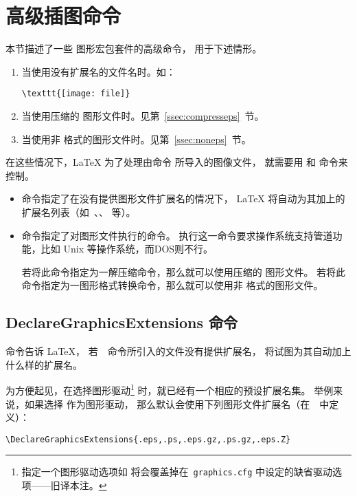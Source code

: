 \section{高级插图命令}\label{sec:adgraphcmd}
本节描述了一些 \LaTeXe{} 图形宏包套件的高级命令，
用于下述情形。
\begin{enumerate}
	\item 当使用没有扩展名的文件名时。如：
\begin{lstlisting}
\texttt{[image: file]}
\end{lstlisting}

	\item 当使用压缩的 图形文件时。见第~\ref{ssec:compresseps}~节。
	\item 当使用非 格式的图形文件时。见第~\ref{ssec:noneps}~节。
\end{enumerate}
在这些情况下，\LaTeX{} 为了处理由命令  所导入的图像文件，
就需要用  和  命令来控制。
\begin{itemize}
	\item {} 命令指定了在没有提供图形文件扩展名的情况下，
	\LaTeX{} 将自动为其加上的扩展名列表（如~、、 等）。
	\item {} 命令指定了对图形文件执行的命令。
	执行这一命令要求操作系统支持管道功能，比如 Unix 等操作系统，而DOS则不行。
	
	若将此命令指定为一解压缩命令，那么就可以使用压缩的  图形文件。
	若将此命令指定为一图形格式转换命令，那么就可以使用非 格式的图形文件。
\end{itemize}

\subsection{DeclareGraphicsExtensions 命令}\label{ssec:deextension}
 命令告诉 \LaTeX{}，
若~~命令所引入的文件没有提供扩展名，
将试图为其自动加上什么样的扩展名。

为方便起见，在选择图形驱动\footnote{
	指定一个图形驱动选项如  将会覆盖掉在~\texttt{graphics.cfg} 中设定的缺省驱动选项——旧译本注。}
时，就已经有一个相应的预设扩展名集。
举例来说，如果选择  作为图形驱动，
那么默认会使用下列图形文件扩展名（在~~中定义）：
\begin{lstlisting}
\DeclareGraphicsExtensions{.eps,.ps,.eps.gz,.ps.gz,.eps.Z}
\end{lstlisting}

